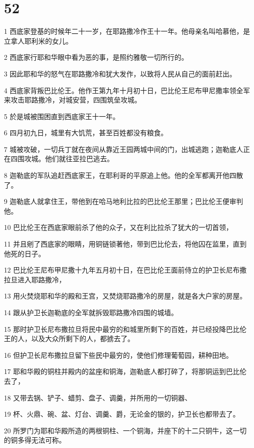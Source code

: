 \chapter{52}

\par 1 西底家登基的时候年二十一岁，在耶路撒冷作王十一年。他母亲名叫哈慕他，是立拿人耶利米的女儿。
\par 2 西底家行耶和华眼中看为恶的事，是照约雅敬一切所行的。
\par 3 因此耶和华的怒气在耶路撒冷和犹大发作，以致将人民从自己的面前赶出。
\par 4 西底家背叛巴比伦王。他作王第九年十月初十日，巴比伦王尼布甲尼撒率领全军来攻击耶路撒冷，对城安营，四围筑垒攻城。
\par 5 於是城被围困直到西底家王十一年。
\par 6 四月初九日，城里有大饥荒，甚至百姓都没有粮食。
\par 7 城被攻破，一切兵丁就在夜间从靠近王园两城中间的门，出城逃跑；迦勒底人正在四围攻城。他们就往亚拉巴逃去。
\par 8 迦勒底的军队追赶西底家王，在耶利哥的平原追上他。他的全军都离开他四散了。
\par 9 迦勒底人就拿住王，带他到在哈马地利比拉的巴比伦王那里；巴比伦王便审判他。
\par 10 巴比伦王在西底家眼前杀了他的众子，又在利比拉杀了犹大的一切首领，
\par 11 并且剜了西底家的眼睛，用铜链锁著他，带到巴比伦去，将他囚在监里，直到他死的日子。
\par 12 巴比伦王尼布甲尼撒十九年五月初十日，在巴比伦王面前侍立的护卫长尼布撒拉旦进入耶路撒冷，
\par 13 用火焚烧耶和华的殿和王宫，又焚烧耶路撒冷的房屋，就是各大户家的房屋。
\par 14 跟从护卫长迦勒底的全军就拆毁耶路撒冷四围的城墙。
\par 15 那时护卫长尼布撒拉旦将民中最穷的和城里所剩下的百姓，并已经投降巴比伦王的人，以及大众所剩下的人，都掳去了。
\par 16 但护卫长尼布撒拉旦留下些民中最穷的，使他们修理葡萄园，耕种田地。
\par 17 耶和华殿的铜柱并殿内的盆座和铜海，迦勒底人都打碎了，将那铜运到巴比伦去了，
\par 18 又带去锅、铲子、蜡剪、盘子、调羹，并所用的一切铜器、
\par 19 杯、火鼎、碗、盆、灯台、调羹、爵，无论金的银的，护卫长也都带去了。
\par 20 所罗门为耶和华殿所造的两根铜柱、一个铜海，并座下的十二只铜牛，这一切的铜多得无法可称。

